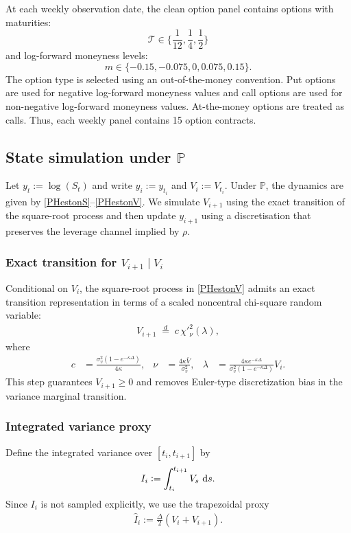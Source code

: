 \documentclass[11pt,a4paper,notitlepage]{article}
\numberwithin{equation}{section}
\begin{document}
At each weekly observation date, the clean option panel contains options with maturities:
\[
\mathcal T \in \lbrace \frac{1}{12},\frac{1}{4},\frac{1}{2}\rbrace
\]
and log-forward moneyness levels:
\[
m\in \lbrace-0.15,-0.075,0,0.075,0.15\rbrace.
\]
The option type is selected using an out-of-the-money convention. Put options are used for negative log-forward moneyness values and call options are used for non-negative log-forward moneyness values. At-the-money options are treated as calls. Thus, each weekly panel contains 15 option contracts.

\subsection{State simulation under $\mathbb{P}$}
Let $y_t:=\log(S_t)$ and write $y_i:=y_{t_i}$ and $V_i:=V_{t_i}$. Under $\mathbb{P}$,
the dynamics are given by \eqref{PHestonS}--\eqref{PHestonV}.
We simulate $V_{i+1}$ using the exact transition of the square-root process and then update $y_{i+1}$
using a discretisation that preserves the leverage channel implied by $\rho$.

\subsubsection{Exact transition for $V_{i+1}\mid V_i$}
Conditional on $V_i$, the square-root process in \eqref{PHestonV} admits an exact transition
representation in terms of a scaled noncentral chi-square random variable:
\begin{align}
V_{i+1} \;\overset{d}{=}\; c\,\chi'^2_{\nu}(\lambda),
\label{eq:CIR_exact}
\end{align}
where
\begin{align}
c &= \frac{\sigma_v^2\left(1-e^{-\kappa \Delta}\right)}{4\kappa}, &
\nu &= \frac{4\kappa \bar{V}}{\sigma_v^2}, &
\lambda &= \frac{4\kappa e^{-\kappa \Delta}}{\sigma_v^2\left(1-e^{-\kappa \Delta}\right)}V_i.
\label{eq:CIR_exact_params}
\end{align}
This step guarantees $V_{i+1}\geq 0$ and removes Euler-type discretization bias in the variance
marginal transition.

\subsubsection{Integrated variance proxy}
Define the integrated variance over $[t_i,t_{i+1}]$ by
\begin{align}
I_i := \int_{t_i}^{t_{i+1}} V_s\,\dif s.
\end{align}
Since $I_i$ is not sampled explicitly, we use the trapezoidal proxy
\begin{align}
\widehat{I}_i := \frac{\Delta}{2}\left(V_i+V_{i+1}\right).
\label{eq:I_trap}
\end{align}
\end{document}
